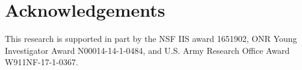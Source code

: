 \documentclass[10pt,twocolumn,letterpaper]{article}
\begin{document}
\section{Acknowledgements}
\vspace{-2mm}
This research is supported in part by the NSF IIS award 1651902, ONR Young Investigator Award N00014-14-1-0484, and U.S. Army Research Office Award W911NF-17-1-0367.



{\small


}
\end{document}
